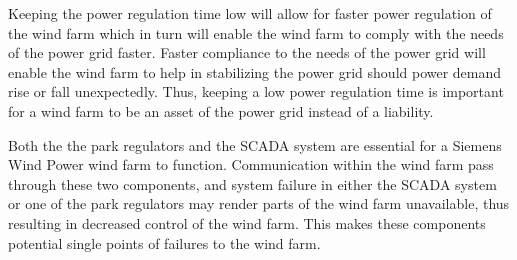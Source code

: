 Keeping the power regulation time low will allow for faster power regulation of the wind farm which in turn will enable the wind farm to comply with the needs of the power grid faster. Faster compliance to the needs of the power grid will enable the wind farm to help in stabilizing the power grid should power demand rise or fall unexpectedly. Thus, keeping a low power regulation time is important for a wind farm to be an asset of the power grid instead of a liability.



Both the the park regulators and the SCADA system are essential for a Siemens Wind Power wind farm to function. Communication within the wind farm pass through these two components, and system failure in either the SCADA system or one of the park regulators may render parts of the wind farm unavailable, thus resulting in decreased control of the wind farm. This makes these components potential single points of failures to the wind farm. 

